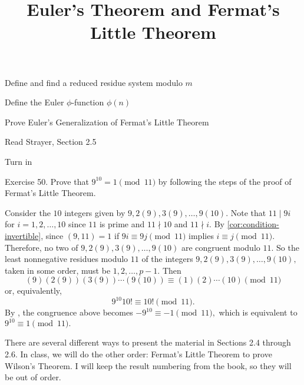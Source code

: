 \documentclass{ximera}
\title{Euler's Theorem and Fermat's Little Theorem}\label{sec:FlT-eulerFLT}
\begin{document}
\begin{abstract}
\end{abstract}
\maketitle

\begin{obj}
	\item Define and find a reduced residue system modulo $m$
	\item Define the Euler $\phi$-function $\phi(n)$
	\item Prove Euler's Generalization of Fermat's Little Theorem
\end{obj}



\begin{pre} 
    \item[Read] Strayer, Section 2.5

    \item[Turn in]  
    
    Exercise 50. Prove that $9^{10} = 1\pmod{11}$ by following the steps of the proof of Fermat's Little Theorem.
    
    \begin{solution}
        Consider the $10$ integers given by $9,2(9), 3(9),\dots, 9(10).$ Note that $11\mid 9i$ for $i=1,2,\dots,10$ since $11$ is prime and $11\nmid 10$ and $11\nmid i.$ By \cref{cor:condition-invertible}, since $(9,11)=1$ if $9i\equiv 9j\pmod{11}$ implies $i\equiv j\pmod{11}.$ Therefore, no two of $9,2(9), 3(9),\dots, 9(10)$ are congruent modulo $11.$ So the least nonnegative residues modulo $11$ of the integers $9,2(9), 3(9),\dots, 9(10),$ taken in some order, must be $1,2,\dots, p-1.$ Then \[(9)(2(9)) (3(9))\cdots (9(10))\equiv (1)(2)\cdots (10)\pmod{11}\] or, equivalently, \[9^{10}10!\equiv 10!\pmod{11}.\] By , the congruence above becomes $-9^{10}\equiv -1\pmod{11},$ which is equivalent to $9^{10}\equiv 1\pmod{11}.$
    \end{solution}
\end{pre}
    


\begin{instructorNotes}
    There are several different ways to present the material in Sections 2.4 through 2.6. In class, we will do the other order: Fermat's Little Theorem to prove Wilson's Theorem. I will keep the result numbering from the book, so they will be out of order.
\end{instructorNotes}
\end{document}
